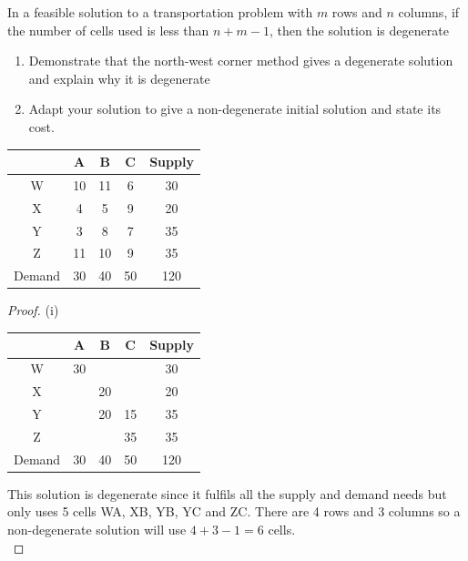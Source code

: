 \documentclass[a4paper]{article}
\begin{document}
\begin{defi}[degenerate]
	In a feasible solution to a transportation problem with $m$ rows and $n$ columns, if the number
	of cells used is less than $n+m-1$, then the solution is degenerate
\end{defi}
\begin{eg}
	\begin{enumerate}
		\item Demonstrate that the north-west corner method gives a degenerate solution and explain why it is degenerate
		\item Adapt your solution to give a non-degenerate initial solution and state its cost.
	\end{enumerate}
	\begin{center}
		\begin{tabular}{|c|c|c|c|c|}
			\hline
			       & A  & B  & C  & Supply \\
			\hline
			W      & 10 & 11 & 6  & 30     \\
			\hline
			X      & 4  & 5  & 9  & 20     \\
			\hline
			Y      & 3  & 8  & 7  & 35     \\
			\hline
			Z      & 11 & 10 & 9  & 35     \\
			\hline
			Demand & 30 & 40 & 50 & 120    \\
			\hline
		\end{tabular}
	\end{center}
	\begin{proof}
		(i)
		\begin{center}
			\begin{tabular}{|c|c|c|c|c|}
				\hline
				       & A  & B  & C  & Supply \\
				\hline
				W      & 30 &    &    & 30     \\
				\hline
				X      &    & 20 &    & 20     \\
				\hline
				Y      &    & 20 & 15 & 35     \\
				\hline
				Z      &    &    & 35 & 35     \\
				\hline
				Demand & 30 & 40 & 50 & 120    \\
				\hline
			\end{tabular}
		\end{center}
		This solution is degenerate since it fulfils all the supply and demand needs but only uses 5 cells WA, XB, YB, YC and ZC. There are 4 rows and 3 columns so a non-degenerate solution will use $4+3-1=6$ cells.\\


\end{proof}
\end{eg}
\end{document}
